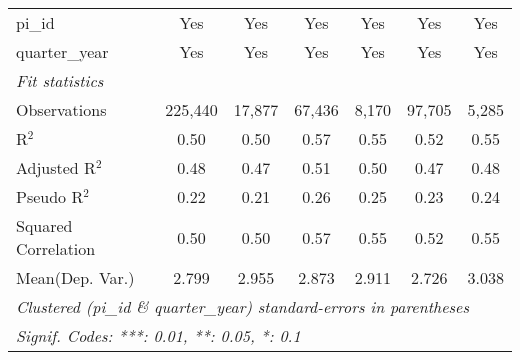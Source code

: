 \begin{tabular}{lcccccc}
   pi\_id                                                     & Yes           & Yes           & Yes           & Yes          & Yes           & Yes\\  
   quarter\_year                                              & Yes           & Yes           & Yes           & Yes          & Yes           & Yes\\  
   \midrule
   \emph{Fit statistics}\\
   Observations                                               & 225,440       & 17,877        & 67,436        & 8,170        & 97,705        & 5,285\\  
   R$^2$                                                      & 0.50          & 0.50          & 0.57          & 0.55         & 0.52          & 0.55\\  
   Adjusted R$^2$                                             & 0.48          & 0.47          & 0.51          & 0.50         & 0.47          & 0.48\\  
   Pseudo R$^2$                                               & 0.22          & 0.21          & 0.26          & 0.25         & 0.23          & 0.24\\  
   Squared Correlation                                        & 0.50          & 0.50          & 0.57          & 0.55         & 0.52          & 0.55\\  
Mean(Dep. Var.) & 2.799 & 2.955 & 2.873 & 2.911 & 2.726 & 3.038 \\
   \midrule \midrule
   \multicolumn{7}{l}{\emph{Clustered (pi\_id \& quarter\_year) standard-errors in parentheses}}\\
   \multicolumn{7}{l}{\emph{Signif. Codes: ***: 0.01, **: 0.05, *: 0.1}}\\
\end{tabular}
\par\endgroup
